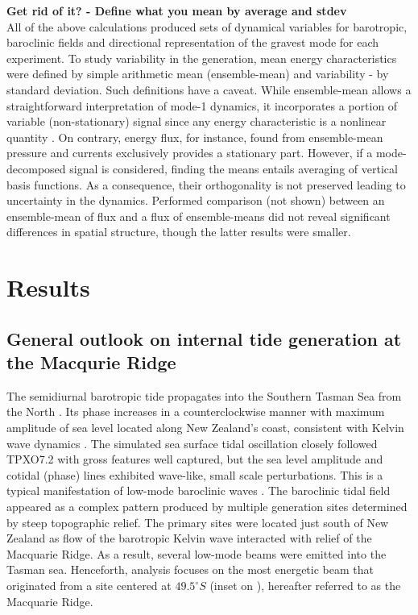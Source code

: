 \documentclass[12pt]{article}
\begin{document}
\textbf{Get rid of it? - Define what you mean by average and stdev}\\
All of the above calculations produced sets of dynamical variables for barotropic, baroclinic 
fields and directional representation of the gravest mode for each experiment. To study 
variability in the generation, mean energy characteristics were defined by simple arithmetic mean 
(ensemble-mean) and variability - by standard deviation. Such definitions have a caveat. 
While ensemble-mean allows a straightforward interpretation of mode-1 dynamics, it 
incorporates  
a portion of variable (non-stationary) signal since any energy characteristic is a nonlinear 
quantity \citep{zaron2014time}. On contrary, energy flux, for instance, found from ensemble-mean 
pressure and currents exclusively provides a stationary part. However, if a mode-decomposed signal 
is considered, finding the means entails averaging of vertical basis functions. As a 
consequence, their orthogonality is not preserved leading to uncertainty in the dynamics. 
Performed comparison (not shown) between an ensemble-mean of flux and a flux of ensemble-means did 
not reveal significant differences in spatial structure, though the latter results were smaller.

\newpage
\section{Results}
\subsection{General outlook on internal tide generation at the Macqurie Ridge}
\label{C3.sec:main_res}
The semidiurnal barotropic tide propagates into the Southern Tasman Sea from the North 
. Its phase increases in a counterclockwise manner with maximum amplitude of sea 
level located along New Zealand's coast, consistent with Kelvin wave dynamics 
\citep{walters2001ocean}. The simulated sea surface tidal oscillation closely followed TPXO7.2 with 
gross 
features well captured, but the sea level amplitude and cotidal (phase) lines exhibited wave-like, 
small scale perturbations. This is a typical manifestation of low-mode baroclinic waves 
\citep{niwa2004three}. The baroclinic tidal field  appeared as a complex 
pattern produced by 
multiple generation sites determined by steep topographic relief. The primary sites were located  
just south of New Zealand as flow of the barotropic Kelvin wave interacted with relief of the 
Macquarie Ridge. As a result, several low-mode beams \citep{rainville2010interference} were emitted 
into the Tasman 
sea. Henceforth, analysis focuses on the most energetic beam that originated from a site centered 
at 
$49.5^{\circ}S$ (inset on ), hereafter referred to as the Macquarie 
Ridge.\\
\end{document}
